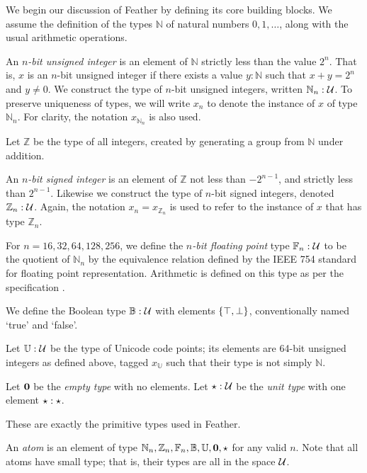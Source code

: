 \documentclass[UKenglish, 11pt, a4paper, parskip=half]{scrbook}
\begin{document}
We begin our discussion of Feather by defining its core building blocks.
We assume the definition of the types \( \mathbb N \) of natural numbers \( 0, 1, \dots \), along with the usual arithmetic operations.
\begin{defn}
    An \textit{\( n \)-bit unsigned integer} is an element of \( \mathbb N \) strictly less than the value \( 2^n \).
    That is, \( x \) is an \( n \)-bit unsigned integer if there exists a value \( y : \mathbb N \) such that \( x + y = 2^n \) and \( y \neq 0 \).
    We construct the type of \( n \)-bit unsigned integers, written \( \mathbb N_n : \mathcal{U} \).
    To preserve uniqueness of types, we will write \( x_n \) to denote the instance of \( x \) of type \( \mathbb N_n \).
    For clarity, the notation \( x_{\mathbb N_n} \) is also used.
\end{defn}
Let \( \mathbb Z \) be the type of all integers, created by generating a group from \( \mathbb N \) under addition.
\begin{defn}
    An \textit{\( n \)-bit signed integer} is an element of \( \mathbb Z \) not less than \( -2^{n-1} \), and strictly less than \( 2^{n-1} \).
    Likewise we construct the type of \( n \)-bit signed integers, denoted \( \mathbb Z_n : \mathcal{U} \).
    Again, the notation \( x_n = x_{\mathbb Z_n} \) is used to refer to the instance of \( x \) that has type \( \mathbb Z_n \).
\end{defn}
\begin{defn}
    For \( n = 16, 32, 64, 128, 256 \), we define the \textit{\( n \)-bit floating point} type \( \mathbb F_n : \mathcal{U} \) to be the quotient of \( \mathbb N_n \) by the equivalence relation defined by the IEEE 754 standard for floating point representation.
    Arithmetic is defined on this type as per the specification \cite{IEEE754}.
\end{defn}
\begin{defn}
    We define the Boolean type \( \mathbb B : \mathcal{U} \) with elements \( \qty{\top, \bot} \), conventionally named `true' and `false'.
\end{defn}
\begin{defn}
    Let \( \mathbb U : \mathcal{U} \) be the type of Unicode code points; its elements are 64-bit unsigned integers as defined above, tagged \( x_{\mathbb U} \) such that their type is not simply \( \mathbb N \).
\end{defn}
\begin{defn}
    Let \( \mathbf{0} \) be the \textit{empty type} with no elements.
    Let \( \star : \mathcal{U} \) be the \textit{unit type} with one element \( \star : \star \).
\end{defn}
These are exactly the primitive types used in Feather.
\begin{defn}
    An \textit{atom} is an element of type \( \mathbb N_n, \mathbb Z_n, \mathbb F_n, \mathbb B, \mathbb U, \mathbf{0}, \star \) for any valid \( n \).
    Note that all atoms have small type; that is, their types are all in the space \( \mathcal{U} \).
\end{defn}
\end{document}
